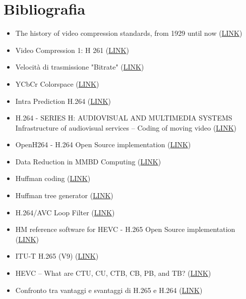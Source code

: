 \documentclass[a4paper,12pt, oneside]{article}
\begin{document}
\section{Bibliografia}

\begin{multicols}{2}
\begin{itemize}[label={}]
    \item The history of video compression standards, from 1929 until now (\href{https://api.video/blog/video-trends/the-history-of-video-compression-starts-in-1929/}{LINK})
    \item Video Compression 1: H 261 (\href{https://users.ece.utexas.edu/~ryerraballi/MSB/pdfs/M4L2.pdf}{LINK})
    \item Velocità di trasmissione "Bitrate" (\href{https://it.wikipedia.org/wiki/Velocit%C3%A0_di_trasmissione}{LINK})
    \item YCbCr Colorspace (\href{https://en.wikipedia.org/wiki/YCbCr}{LINK})
    \item Intra Prediction H.264 (\href{https://www.sciencedirect.com/topics/computer-science/intra-prediction}{LINK})

    \item H.264 - SERIES H: AUDIOVISUAL AND MULTIMEDIA SYSTEMS 
        Infrastructure of audiovisual services – Coding of moving 
        video (\href{https://www.itu.int/rec/T-REC-H.264-202108-I/en}{LINK})
    \item OpenH264 - H.264 Open Source implementation (\href{https://github.com/cisco/openh264}{LINK})
    \item Data Reduction in MMBD Computing  (\href{https://www.researchgate.net/publication/334546287_Data_Reduction_in_MMBD_Computing#pf17}{LINK})
    \item Huffman coding (\href{https://en.wikipedia.org/wiki/Huffman_coding}{LINK})
    \item Huffman tree generator (\href{https://suhaan-bhandary.github.io/Huffman-Coding/}{LINK})

    \item H.264/AVC Loop Filter (\href{https://www.vcodex.com/h264avc-loop-filter}{LINK})
    \item HM reference software for HEVC - H.265 Open Source implementation (\href{https://vcgit.hhi.fraunhofer.de/jvet/HM}{LINK})
    \item ITU-T H.265 (V9) (\href{https://www.itu.int/rec/T-REC-H.265-202309-I/en}{LINK})
    \item HEVC – What are CTU, CU, CTB, CB, PB, and TB? (\href{https://codesequoia.wordpress.com/2012/10/28/hevc-ctu-cu-ctb-cb-pb-and-tb/}{LINK})
    \item Confronto tra vantaggi e svantaggi di H.265 e H.264 (\href{https://zhuanlan.zhihu.com/p/519752821}{LINK})


\end{itemize}
\end{multicols}
\end{document}
